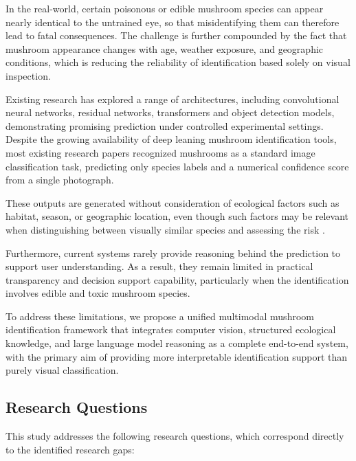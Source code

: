 \documentclass[journal,transmag]{IEEEtran}
\begin{document}
In the real-world, certain poisonous or edible mushroom species can appear nearly identical to the untrained eye, so that misidentifying them can therefore lead to fatal consequences. The challenge is further compounded by the fact that mushroom appearance changes with age, weather exposure, and geographic conditions, which is reducing the reliability of identification based solely on visual inspection\cite{picek2025fungitastic}.

Existing research has explored a range of architectures, including convolutional neural networks, residual networks, transformers and object detection models, demonstrating promising prediction under controlled experimental settings\cite{kuznetsov2026}. Despite the growing availability of deep leaning mushroom identification tools, most existing research papers recognized mushrooms as a standard image classification task, predicting only species labels and a numerical confidence score from a single photograph.
 
 These outputs are generated without consideration of ecological factors such as habitat, season, or geographic location, even though such factors may be relevant when distinguishing between visually similar species and assessing the risk \cite{picek2025fungitastic}. 
 
 Furthermore, current systems rarely provide reasoning behind the prediction to support user understanding. As a 
 result, they remain limited in practical transparency and decision support capability, particularly when the identification involves edible and toxic mushroom species\cite{kuznetsov2026}.

To address these limitations, we propose a unified multimodal mushroom identification framework that integrates computer vision, structured ecological knowledge, and large language model reasoning as a complete end-to-end system, with the primary aim of providing more interpretable identification support than purely visual classification.



\subsection{\textbf{Research Questions}}
This study addresses the following research questions, which correspond directly to the identified research gaps: 
\end{document}
